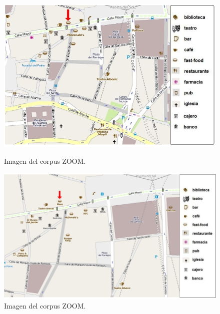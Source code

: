 \begin{figure}
\begin{minipage}[b]{0.48\linewidth}
\centering
\includegraphics[width=\textwidth]{images/corpus/mapa4.png}
\caption{Imagen del corpus ZOOM.}
\label{mapa3}
\end{minipage}
\hspace*{0cm}
\begin{minipage}[b]{0.55\linewidth}
\centering
\includegraphics[width=\textwidth]{images/corpus/mapa14.png}
\caption{Imagen del corpus ZOOM.}
\label{mapa4}
\end{minipage}
\end{figure}
